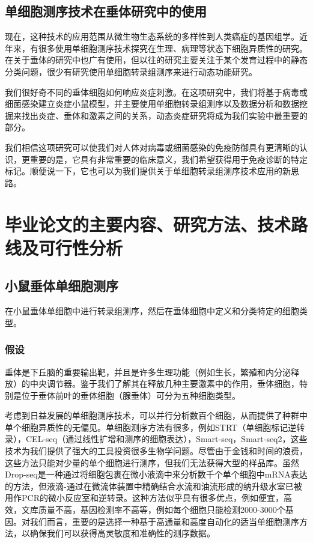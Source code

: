 \documentclass[class = opening]{whuthesis}
\begin{document}
\subsection{单细胞测序技术在垂体研究中的使用}
  现在，这种技术的应用范围从微生物生态系统的多样性到人类癌症的基因组学。近年来，有很多使用单细胞测序技术探究在生理、病理等状态下细胞异质性的研究\cite{hammond2019single,keren2017unique,li2019developmental,masuda2019spatial,masuda2020novel,matcovitch2016microglia}。
在关于垂体的研究中也广有使用，但以往的研究\cite{chen2020single,cheung2018single,ho2020single,fletcher2019cell}主要关注于某个发育过程中的静态分类问题，很少有研究使用单细胞转录组测序来进行动态功能研究。

  我们很好奇不同的垂体细胞如何响应炎症刺激。在这项研究中，我们将基于病毒或细菌感染建立炎症小鼠模型，并主要使用单细胞转录组测序以及数据分析和数据挖掘来找出炎症、垂体和激素之间的关系，动态炎症研究将成为我们实验中最重要的部分。

  我们相信这项研究可以使我们对人体对病毒或细菌感染的免疫防御具有更清晰的认识，更重要的是，它具有非常重要的临床意义，我们希望获得用于免疫诊断的特定标记。顺便说一下，它也可以为我们提供关于单细胞转录组测序技术应用的新思路。

\section{毕业论文的主要内容、研究方法、技术路线及可行性分析}
\subsection{小鼠垂体单细胞测序}
  在小鼠垂体单细胞中进行转录组测序，然后在垂体细胞中定义和分类特定的细胞类型。
\subsubsection{假设}
  垂体是下丘脑的重要输出靶，并且是许多生理功能（例如生长，繁殖和内分泌释放）的中央调节器。鉴于我们了解其在释放几种主要激素中的作用，垂体细胞，特别是位于垂体前叶的垂体细胞（腺垂体）可分为五种细胞类型。

  考虑到日益发展的单细胞测序技术，可以并行分析数百个细胞，从而提供了种群中单个细胞异质性的无偏见。单细胞测序方法有很多，例如STRT（单细胞标记逆转录），CEL-seq（通过线性扩增和测序的细胞表达），Smart-seq，Smart-seq2，这些技术为我们提供了强大的工具投资很多生物学问题。尽管由于金钱和时间的浪费，这些方法只能对少量的单个细胞进行测序，但我们无法获得大型的样品库。虽然Drop-seq是一种通过将细胞包裹在微小液滴中来分析数千个单个细胞中mRNA表达的方法，但液滴-通过在微流体装置中精确结合水流和油流形成的纳升级水室已被用作PCR的微小反应室和逆转录。这种方法似乎具有很多优点，例如便宜，高效，文库质量不高，基因检测率不高等，例如每个细胞只能检测2000-3000个基因。对我们而言，重要的是选择一种基于高通量和高度自动化的适当单细胞测序方法，以确保我们可以获得高灵敏度和准确性的测序数据。
\end{document}
